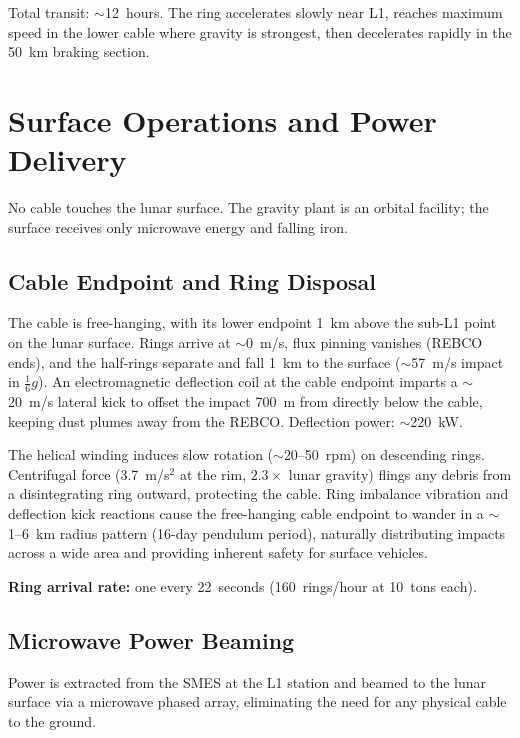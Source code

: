 \documentclass[12pt,letterpaper]{article}
\begin{document}
Total transit: $\sim$12~hours. The ring accelerates slowly near L1, reaches maximum speed in the lower cable where gravity is strongest, then decelerates rapidly in the 50~km braking section.

\section{Surface Operations and Power Delivery}

No cable touches the lunar surface. The gravity plant is an orbital facility; the surface receives only microwave energy and falling iron.

\subsection{Cable Endpoint and Ring Disposal}

The cable is free-hanging, with its lower endpoint 1~km above the sub-L1 point on the lunar surface. Rings arrive at ${\sim}$0~m/s, flux pinning vanishes (REBCO ends), and the half-rings separate and fall 1~km to the surface (${\sim}$57~m/s impact in $\frac{1}{6}g$). An electromagnetic deflection coil at the cable endpoint imparts a ${\sim}$20~m/s lateral kick to offset the impact 700~m from directly below the cable, keeping dust plumes away from the REBCO\@. Deflection power: ${\sim}$220~kW.

The helical winding induces slow rotation (${\sim}$20--50~rpm) on descending rings. Centrifugal force (3.7~m/s$^2$ at the rim, $2.3\times$ lunar gravity) flings any debris from a disintegrating ring outward, protecting the cable. Ring imbalance vibration and deflection kick reactions cause the free-hanging cable endpoint to wander in a ${\sim}$1--6~km radius pattern (16-day pendulum period), naturally distributing impacts across a wide area and providing inherent safety for surface vehicles.

\textbf{Ring arrival rate:} one every 22~seconds (160~rings/hour at 10~tons each).

\subsection{Microwave Power Beaming}\label{sec:microwave}

Power is extracted from the SMES at the L1 station and beamed to the lunar surface via a microwave phased array, eliminating the need for any physical cable to the ground.
\end{document}
